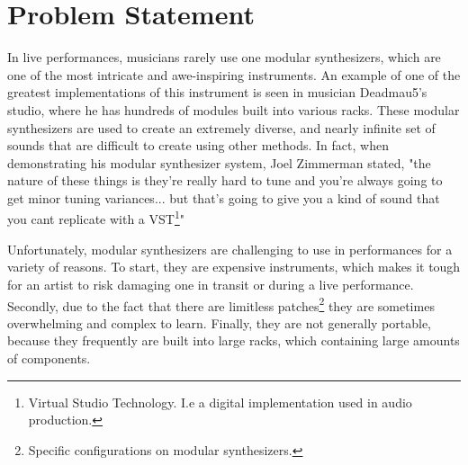 \section{Problem Statement}
    
    
    
    
    
    In live performances, musicians rarely use one modular synthesizers, which are one of the most intricate and awe-inspiring instruments.
    An example of one of the greatest implementations of this instrument is seen in musician Deadmau5's studio\cite{mau5trap}, where he has hundreds of modules built into various racks. 
    These modular synthesizers are used to create an extremely diverse, and nearly infinite set of sounds that are difficult to create using other methods.
    In fact, when demonstrating his modular synthesizer system, Joel Zimmerman stated, "the nature of these things is they're really hard to tune and you're always going to get minor tuning variances... but that's going to give you a kind of sound that you cant replicate with a VST\footnote{Virtual Studio Technology.
    I.e a digital implementation used in audio production.}"\cite{mc:deadmau5}
    
    Unfortunately, modular synthesizers are challenging to use in performances for a variety of reasons.
    To start, they are expensive instruments, which makes it tough for an artist to risk damaging one in transit or during a live performance.
    Secondly, due to the fact that there are limitless patches\footnote{Specific configurations on modular synthesizers.} they are sometimes overwhelming and complex to learn.
    Finally, they are not generally portable, because they frequently are built into large racks, which containing large amounts of components.
    
